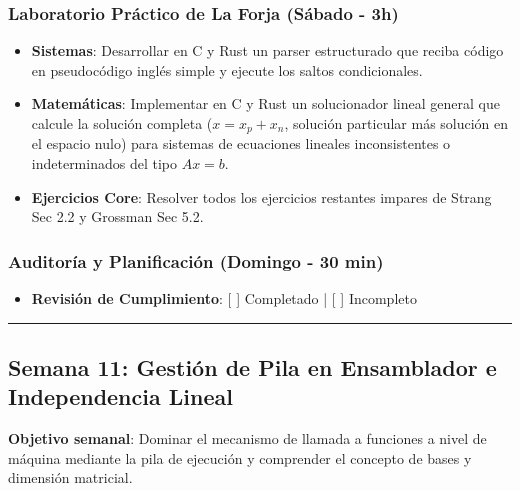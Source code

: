 \documentclass[11pt, a4paper]{article}
\begin{document}
\subsubsection{Laboratorio Práctico de La Forja (Sábado - 3h)}
\begin{itemize}
    \item \textbf{Sistemas}: Desarrollar en C y Rust un parser estructurado que reciba código en pseudocódigo inglés simple y ejecute los saltos condicionales.
    \item \textbf{Matemáticas}: Implementar en C y Rust un solucionador lineal general que calcule la solución completa ($x = x_p + x_n$, solución particular más solución en el espacio nulo) para sistemas de ecuaciones lineales inconsistentes o indeterminados del tipo $Ax = b$.
    \item \textbf{Ejercicios Core}: Resolver todos los ejercicios restantes impares de Strang Sec 2.2 y Grossman Sec 5.2.
\end{itemize}

\subsubsection{Auditoría y Planificación (Domingo - 30 min)}
\begin{itemize}
    \item \textbf{Revisión de Cumplimiento}: [ ] Completado | [ ] Incompleto
\end{itemize}

\noindent\rule{\textwidth}{0.4pt}

\subsection{Semana 11: Gestión de Pila en Ensamblador e Independencia Lineal}
\textbf{Objetivo semanal}: Dominar el mecanismo de llamada a funciones a nivel de máquina mediante la pila de ejecución y comprender el concepto de bases y dimensión matricial.
\end{document}

